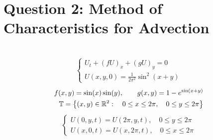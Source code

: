 \documentclass{article}
\begin{document}
\section*{Question 2: Method of Characteristics for Advection}\
    \large
    \begin{align}
        \begin{cases}
            U_t + (fU)_x + (gU)_y =0 \\
            U(x,y,0) = \frac{1}{2\pi^2}\sin^2(x+y)
        \end{cases}
    \end{align}
    \normalsize
    \begin{align}
        f(x,y) = \sin(x)\sin(y), \quad\quad g(x,y) = 1 - e^{\sin(x+y)} \\
        \mathbb{T} = \left\{(x,y) \in \mathbb{R}^2:\quad 0 \le x \le 2\pi, \quad 0 \le
        y \le 2\pi\right\}
    \end{align}
    \begin{align}
        \begin{cases}
            U(0,y,t) = U(2\pi,y,t), \quad 0 \le y \le 2\pi\\
            U(x,0,t) = U(x,2\pi,t), \quad 0 \le x \le 2\pi
        \end{cases}
    \end{align}
\end{document}
